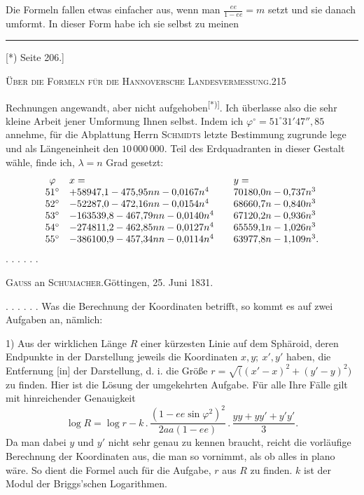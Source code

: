 Die Formeln fallen etwas einfacher aus, wenn man \(\frac{ee}{1-ee}=m\) setzt und sie danach umformt. In dieser Form habe ich sie selbst zu meinen
\par\noindent\rule{4cm}{.4pt}\par
{\footnotesize\noindent\hspace*{\parindent}[*) Seite 206.]\par}

\par\clearpage
\noindent\mbox{}\hfill{\small\textsc{Über die Formeln für die Hannoversche Landesvermessung.}}\hfill215\par\medskip
\noindent Rechnungen angewandt, aber nicht aufgehoben\textsuperscript{[*)]}. Ich überlasse also die sehr kleine Arbeit jener Umformung Ihnen selbst. Indem ich \(\varphi^\circ=51^\circ31'47''{,}85\) annehme, für die Abplattung Herrn \textsc{Schmidts} letzte Bestimmung zugrunde lege und als Längeneinheit den \(10\,000\,000.\) Teil des Erdquadranten in dieser Gestalt wähle, finde ich, \(\lambda=n\) Grad gesetzt:
\[
\begin{array}{c@{\quad}l@{\qquad}l}
\varphi&x=&y=\\
51^\circ&+58947{,}1-475{,}95nn-0{,}0167n^4&70180{,}0n-0{,}737n^3\\
52^\circ&-52287{,}0-472{,}16nn-0{,}0154n^4&68660{,}7n-0{,}840n^3\\
53^\circ&-163539{,}8-467{,}79nn-0{,}0140n^4&67120{,}2n-0{,}936n^3\\
54^\circ&-274811{,}2-462{,}85nn-0{,}0127n^4&65559{,}1n-1{,}026n^3\\
55^\circ&-386100{,}9-457{,}34nn-0{,}0114n^4&63977{,}8n-1{,}109n^3.
\end{array}
\]
. . . . . .
\bigskip
\begin{center}\textsc{Gauss} an \textsc{Schumacher}.\quad Göttingen, 25. Juni 1831.\end{center}
. . . . . . Was die Berechnung der Koordinaten betrifft, so kommt es auf zwei Aufgaben an, nämlich:

1) Aus der wirklichen Länge \(R\) einer kürzesten Linie auf dem Sphäroid, deren Endpunkte in der Darstellung jeweils die Koordinaten \(x,y;\ x',y'\) haben, die Entfernung [in] der Darstellung, d. i. die Größe \(r=\surd((x'-x)^2+(y'-y)^2)\) zu finden. Hier ist die Lösung der umgekehrten Aufgabe. Für alle Ihre Fälle gilt mit hinreichender Genauigkeit
\[
\log R=\log r-k\,.\,\frac{(1-ee\sin\varphi^2)^2}{2aa(1-ee)}\,.\,\frac{yy+yy'+y'y'}3.
\]
Da man dabei \(y\) und \(y'\) nicht sehr genau zu kennen braucht, reicht die vorläufige Berechnung der Koordinaten aus, die man so vornimmt, als ob alles in plano wäre. So dient die Formel auch für die Aufgabe, \(r\) aus \(R\) zu finden. \(k\) ist der Modul der Briggs'schen Logarithmen.

